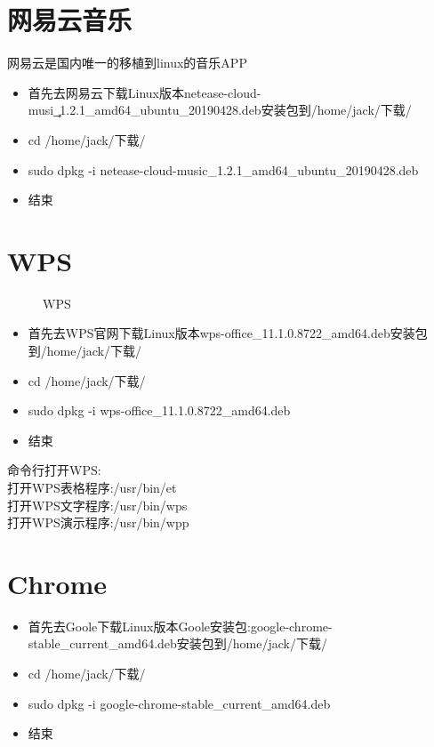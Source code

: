 \documentclass[utf8]{book}
\begin{document}
\begin{appendices}
	\section{网易云音乐}\label{u3}
	网易云是国内唯一的移植到linux的音乐APP
	\begin{itemize}
		\item 首先去网易云下载Linux版本netease-cloud-musi\c\_1.2.1\_amd64\_ubuntu\_20190428.deb安装包到/home/jack/下载/
		\item cd /home/jack/下载/
		\item sudo  dpkg  -i  netease-cloud-music\_1.2.1\_amd64\_ubuntu\_20190428.deb
		\item 结束
	\end{itemize}
	
	\section{WPS}\label{u4}
	\begin{figure}[H]
	\centering
	\subfigure[国际版]{
		\texttt{[image: p66]}}
	\subfigure[中文版]{
		\texttt{[image: p67]}}
	\caption{\small{WPS}}
	\end{figure}
		\begin{itemize}
		\item 首先去WPS官网下载Linux版本wps-office\_11.1.0.8722\_amd64.deb安装包到/home/jack/下载/
		\item cd /home/jack/下载/
		\item sudo  dpkg  -i  wps-office\_11.1.0.8722\_amd64.deb
		\item 结束
	\end{itemize}

	命令行打开WPS:\\
	\indent 打开WPS表格程序:/usr/bin/et\\
	\indent 打开WPS文字程序:/usr/bin/wps\\
	\indent 打开WPS演示程序:/usr/bin/wpp\\
	
	\section{Chrome}\label{u5}
	
	\begin{itemize}
		\item 首先去Goole下载Linux版本Goole安装包:google-chrome-stable\_current\_amd64.deb安装包到/home/jack/下载/
		\item cd /home/jack/下载/
		\item sudo  dpkg  -i  google-chrome-stable\_current\_amd64.deb
		\item 结束
	\end{itemize}
	

\end{appendices}
\end{document}
